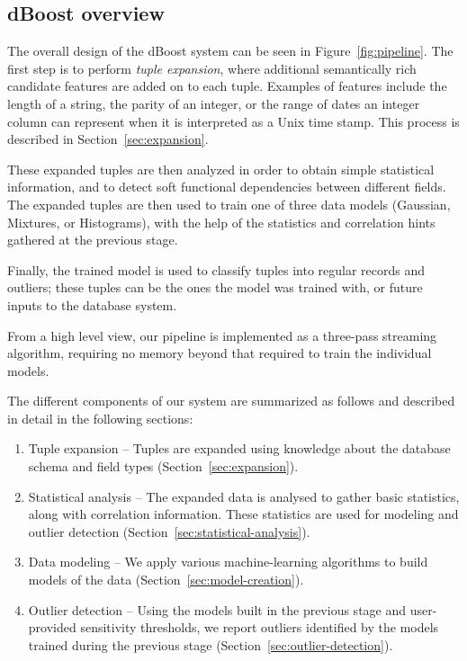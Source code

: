 \subsection{dBoost overview}
\label{sec:overview}

\begin{figure*}
  \centering %
  \caption{The \dBoost/ pipeline}
  \label{fig:pipeline}
\end{figure*}

The overall design of the dBoost system can be seen in Figure~\ref{fig:pipeline}.
The first step is to perform \emph{tuple expansion}, where additional semantically rich candidate features are added on to each tuple.
Examples of features include the length of a string, the parity of an integer, or the range of dates an integer column can represent when it is interpreted as a Unix time stamp.
This process is described in Section~\ref{sec:expansion}.


These expanded tuples are then analyzed in order to obtain simple statistical information, and to detect soft functional dependencies between different fields. The expanded tuples are then used to train one of three data models (Gaussian, Mixtures, or Histograms), with the help of the statistics and correlation hints gathered at the previous stage.

Finally, the trained model is used to classify tuples into regular records and outliers; these tuples can be the ones the model was trained with, or future inputs to the database system.

From a high level view, our pipeline is implemented as a three-pass streaming algorithm, requiring no memory beyond that required to train the individual models.

The different components of our system are summarized as follows and described in detail in the following sections:

\begin{enumerate}
\item Tuple expansion -- Tuples are expanded using knowledge about the database schema and field types (Section~\ref{sec:expansion}).
\item Statistical analysis -- The expanded data is analysed to gather basic statistics, along with correlation information. These statistics are used for modeling and outlier detection (Section~\ref{sec:statistical-analysis}).
\item Data modeling -- We apply various machine-learning algorithms to build models of the data (Section~\ref{sec:model-creation}).
\item Outlier detection -- Using the models built in the previous stage and user-provided sensitivity thresholds, we report outliers identified by the models trained during the previous stage (Section~\ref{sec:outlier-detection}).
\end{enumerate}

